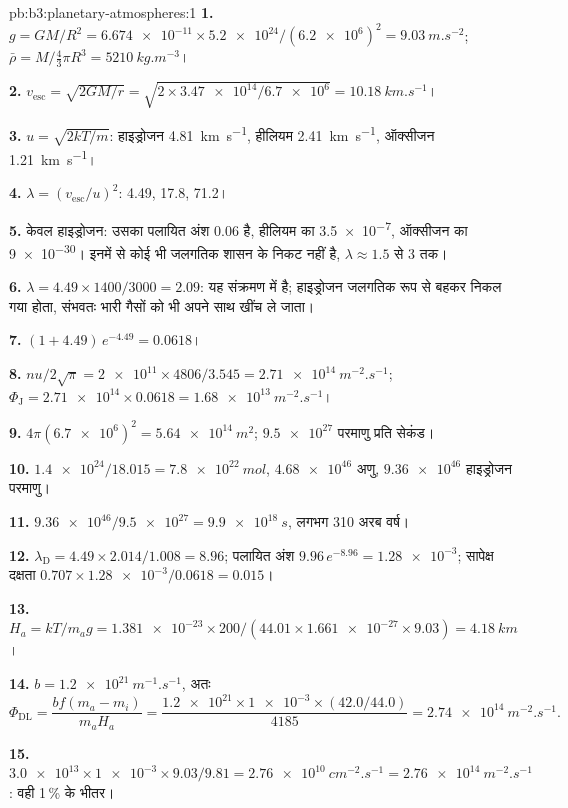 \begin{solution}{pb:b3:planetary-atmospheres:1}
\textbf{1.} $g = GM/R^2 = \num{6.674e-11}\times\num{5.2e24}/(\num{6.2e6})^2 =
\qty{9.03}{m.s^{-2}}$; $\bar\rho = M/\tfrac43\pi R^3 = \qty{5210}{kg.m^{-3}}$।

\textbf{2.} $v_\mathrm{esc} = \sqrt{2GM/r} = \sqrt{2\times\num{3.47e14}/\num{6.7e6}}
= \qty{10.18}{km.s^{-1}}$।

\textbf{3.} $u = \sqrt{2kT/m}$: हाइड्रोजन \qty{4.81}{km.s^{-1}}, हीलियम
\qty{2.41}{km.s^{-1}}, ऑक्सीजन \qty{1.21}{km.s^{-1}}।

\textbf{4.} $\lambda = (v_\mathrm{esc}/u)^2$: 4.49, 17.8, 71.2।

\textbf{5.} केवल हाइड्रोजन: उसका पलायित अंश 0.06 है, हीलियम का
\num{3.5e-7}, ऑक्सीजन का \num{9e-30}। इनमें से कोई भी जलगतिक शासन के निकट नहीं है,
$\lambda \approx 1.5$ से 3 तक।

\textbf{6.} $\lambda = 4.49\times1400/3000 = 2.09$: यह संक्रमण में है;
हाइड्रोजन जलगतिक रूप से बहकर निकल गया होता, संभवतः
भारी गैसों को भी अपने साथ खींच ले जाता।

\textbf{7.} $(1 + 4.49)\,e^{-4.49} = 0.0618$।

\textbf{8.} $n u/2\sqrt\pi = \num{2e11}\times4806/3.545 = \qty{2.71e14}{m^{-2}.s^{-1}}$;
$\Phi_\mathrm J = \num{2.71e14}\times0.0618 = \qty{1.68e13}{m^{-2}.s^{-1}}$।

\textbf{9.} $4\pi(\num{6.7e6})^2 = \qty{5.64e14}{m^2}$; $\num{9.5e27}$ परमाणु
प्रति सेकंड।

\textbf{10.} $\num{1.4e24}/18.015 = \qty{7.8e22}{mol}$, $\num{4.68e46}$ अणु,
$\num{9.36e46}$ हाइड्रोजन परमाणु।

\textbf{11.} $\num{9.36e46}/\num{9.5e27} = \qty{9.9e18}{s}$, लगभग 310 अरब
वर्ष।

\textbf{12.} $\lambda_\mathrm D = 4.49\times2.014/1.008 = 8.96$; पलायित अंश
$9.96\,e^{-8.96} = \num{1.28e-3}$; सापेक्ष दक्षता $0.707\times
\num{1.28e-3}/0.0618 = 0.015$।

\textbf{13.} $H_a = kT/m_a g = \num{1.381e-23}\times200/(44.01\times\num{1.661e-27}
\times9.03) = \qty{4.18}{km}$।

\textbf{14.} $b = \qty{1.2e21}{m^{-1}.s^{-1}}$, अतः
\[
\Phi_\mathrm{DL} = \frac{b f(m_a - m_i)}{m_a H_a}
= \frac{\num{1.2e21}\times\num{1e-3}\times(42.0/44.0)}{4185}
= \qty{2.74e14}{m^{-2}.s^{-1}}.
\]

\textbf{15.} $\num{3.0e13}\times\num{1e-3}\times9.03/9.81 =
\qty{2.76e10}{cm^{-2}.s^{-1}} = \qty{2.76e14}{m^{-2}.s^{-1}}$: वही
1\,\% के भीतर।


\end{solution}
